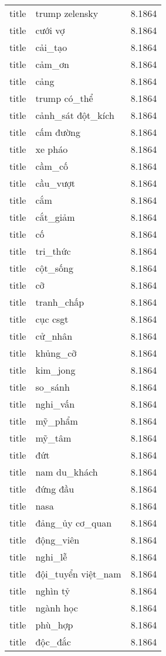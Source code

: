 \documentclass{article}
\begin{document}
\begin{tabular}{lll}
title & trump zelensky & 8.1864\\
title & cưới vợ & 8.1864\\
title & cải\_tạo & 8.1864\\
title & cảm\_ơn & 8.1864\\
title & cảng & 8.1864\\
title & trump có\_thể & 8.1864\\
title & cảnh\_sát đột\_kích & 8.1864\\
title & cấm đường & 8.1864\\
title & xe pháo & 8.1864\\
title & cầm\_cố & 8.1864\\
title & cầu\_vượt & 8.1864\\
title & cắm & 8.1864\\
title & cắt\_giảm & 8.1864\\
title & cố & 8.1864\\
title & tri\_thức & 8.1864\\
title & cột\_sống & 8.1864\\
title & cỡ & 8.1864\\
title & tranh\_chấp & 8.1864\\
title & cục csgt & 8.1864\\
title & cử\_nhân & 8.1864\\
title & khủng\_cỡ & 8.1864\\
title & kim\_jong & 8.1864\\
title & so\_sánh & 8.1864\\
title & nghi\_vấn & 8.1864\\
title & mỹ\_phẩm & 8.1864\\
title & mỹ\_tâm & 8.1864\\
title & đứt & 8.1864\\
title & nam du\_khách & 8.1864\\
title & đứng đầu & 8.1864\\
title & nasa & 8.1864\\
title & đảng\_ủy cơ\_quan & 8.1864\\
title & động\_viên & 8.1864\\
title & nghi\_lễ & 8.1864\\
title & đội\_tuyển việt\_nam & 8.1864\\
title & nghìn tỷ & 8.1864\\
title & ngành học & 8.1864\\
title & phù\_hợp & 8.1864\\
title & độc\_đắc & 8.1864\\

\end{tabular}
\end{document}
